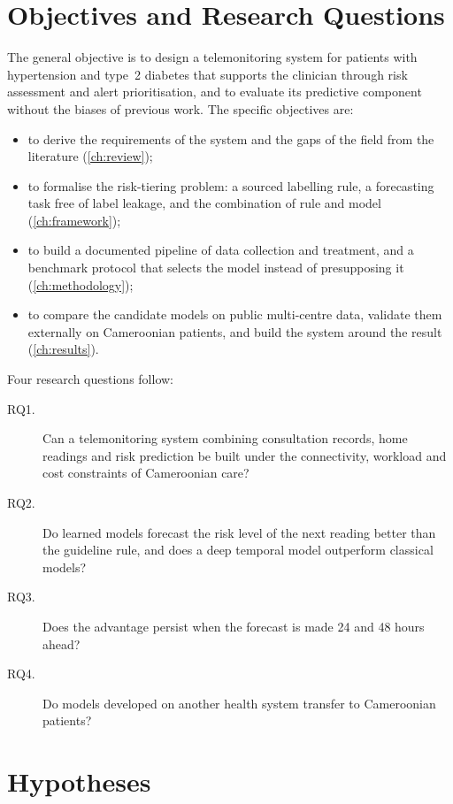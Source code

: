 \documentclass[11pt,a4paper,oneside]{report}
\begin{document}
\section*{Objectives and Research Questions}

The general objective is to design a telemonitoring system for patients with hypertension and type~2 diabetes that supports the clinician through risk assessment and alert prioritisation, and to evaluate its predictive component without the biases of previous work. The specific objectives are:
\begin{itemize}
  \item to derive the requirements of the system and the gaps of the field from the literature (\cref{ch:review});
  \item to formalise the risk-tiering problem: a sourced labelling rule, a forecasting task free of label leakage, and the combination of rule and model (\cref{ch:framework});
  \item to build a documented pipeline of data collection and treatment, and a benchmark protocol that selects the model instead of presupposing it (\cref{ch:methodology});
  \item to compare the candidate models on public multi-centre data, validate them externally on Cameroonian patients, and build the system around the result (\cref{ch:results}).
\end{itemize}

Four research questions follow:
\begin{description}
  \item[RQ1.] Can a telemonitoring system combining consultation records, home readings and risk prediction be built under the connectivity, workload and cost constraints of Cameroonian care?
  \item[RQ2.] Do learned models forecast the risk level of the next reading better than the guideline rule, and does a deep temporal model outperform classical models?
  \item[RQ3.] Does the advantage persist when the forecast is made 24 and 48 hours ahead?
  \item[RQ4.] Do models developed on another health system transfer to Cameroonian patients?
\end{description}

\section*{Hypotheses}
\end{document}
